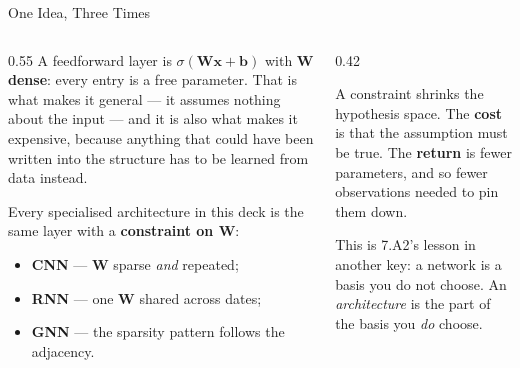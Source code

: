 \begin{frame}{One Idea, Three Times}
\begin{columns}[T]
\begin{column}{0.55\textwidth}
\small
A feedforward layer is $\sigma(\mathbf{W}\mathbf{x}+\mathbf{b})$ with $\mathbf{W}$ \textbf{dense}: every entry is a free parameter. That is what makes it general --- it assumes nothing about the input --- and it is also what makes it expensive, because anything that could have been written into the structure has to be learned from data instead.
\medskip

Every specialised architecture in this deck is the same layer with a \textbf{constraint on $\mathbf{W}$}:
\begin{itemize}\small\setlength{\itemsep}{1mm}
  \item \textbf{CNN} --- $\mathbf{W}$ sparse \emph{and} repeated;
  \item \textbf{RNN} --- one $\mathbf{W}$ shared across dates;
  \item \textbf{GNN} --- the sparsity pattern follows the adjacency.
\end{itemize}
\end{column}
\begin{column}{0.42\textwidth}
\begin{conceptbox}[title=\textbf{The trade, stated once}]\small
A constraint shrinks the hypothesis space. The \textbf{cost} is that the assumption must be true. The \textbf{return} is fewer parameters, and so fewer observations needed to pin them down.
\end{conceptbox}
\medskip
\begin{takeawaybox}\footnotesize
This is 7.A2's lesson in another key: a network is a basis you do not choose. An \emph{architecture} is the part of the basis you \emph{do} choose.
\end{takeawaybox}
\end{column}
\end{columns}
\vspace{1mm}
\end{frame}

